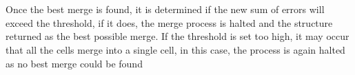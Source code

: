 \\
\\
Once the best merge is found, it is determined if the new sum of errors will exceed the threshold, if it does, the merge process is halted and the structure returned as the best possible merge. If the threshold is set too high, it may occur that all the cells merge into a single cell, in this case, the process is again halted as no best merge could be found